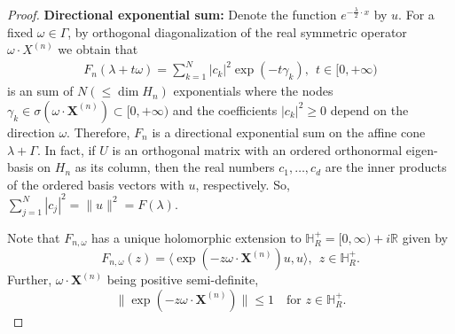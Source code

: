 \documentclass[10pt,a4paper]{amsart}
\begin{document}
\begin{proof}
\vspace{2mm}

 \noindent \textbf{Directional exponential sum:} Denote the function $e^{-\frac{\lambda}{2} \cdot x}$ by $u$. For a fixed $\omega \in \Gamma$, by orthogonal diagonalization of the real symmetric operator $ \omega \cdot X^{(n)}$ we obtain that
	\begin{align}\label{Eq:dir-exp-sum}
	   F_n(\lambda + t \omega) = \sum_{k=1}^N |c_k|^2 \exp{(-t \gamma_k )}, \ \ t\in [0, +\infty) 
	\end{align}
    is an sum of $N ( \leq \dim H_n)$ exponentials where the nodes $\gamma_k \in \sigma (\omega \cdot \boldsymbol{X}^{(n)}) \subset [0, +\infty)$ and the coefficients $|c_k|^2 \geq 0$ depend on the direction $\omega$. Therefore, $F_n$ is a directional exponential sum on the affine cone $\lambda +\Gamma$.
    In fact, if $U$ is an orthogonal matrix with an ordered orthonormal eigen-basis on $H_n$ as its column, then the real numbers $c_1, \dots, c_d$ are the inner products of the ordered basis vectors with $u$, respectively. So, $\sum_{j=1}^N |c_j|^2 = \|u\|^2 = F(\lambda)$. 
    
     Note that $F_{n, \omega}$ has a unique holomorphic extension to $\mathbb{H}^+_R = [0,\infty) + i \mathbb{R}$ given by
    $$
    F_{n, \omega}(z) =  \langle \exp(- z \omega \cdot \boldsymbol{X}^{(n)})u, u \rangle, \ \ z\in \mathbb{H}^+_R.
    $$
    Further, $\omega \cdot \boldsymbol{X}^{(n)}$ being positive semi-definite,
    $$ \| \exp(-z  \omega \cdot \boldsymbol{X}^{(n)}) \| \leq 1 \quad \text{for } z\in \mathbb{H}^+_R.$$
    

\end{proof}
\end{document}

